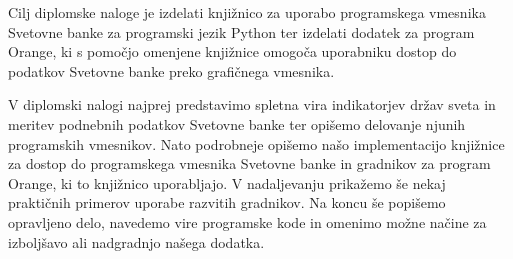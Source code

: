 Cilj diplomske naloge je izdelati knjižnico za uporabo programskega vmesnika
Svetovne banke za programski jezik Python ter izdelati dodatek za program Orange, ki s pomočjo omenjene
knjižnice omogoča uporabniku dostop do podatkov Svetovne banke preko
grafičnega vmesnika.


V diplomski nalogi najprej predstavimo spletna vira indikatorjev
držav sveta in meritev podnebnih podatkov Svetovne banke ter
opišemo delovanje njunih programskih vmesnikov.
Nato podrobneje opišemo našo implementacijo knjižnice za dostop do
programskega vmesnika Svetovne banke in gradnikov za program Orange, ki to
knjižnico uporabljajo. V nadaljevanju prikažemo še nekaj praktičnih 
primerov uporabe razvitih gradnikov. Na koncu še popišemo opravljeno 
delo, navedemo vire programske kode in omenimo možne načine za izboljšavo ali 
nadgradnjo našega dodatka.














